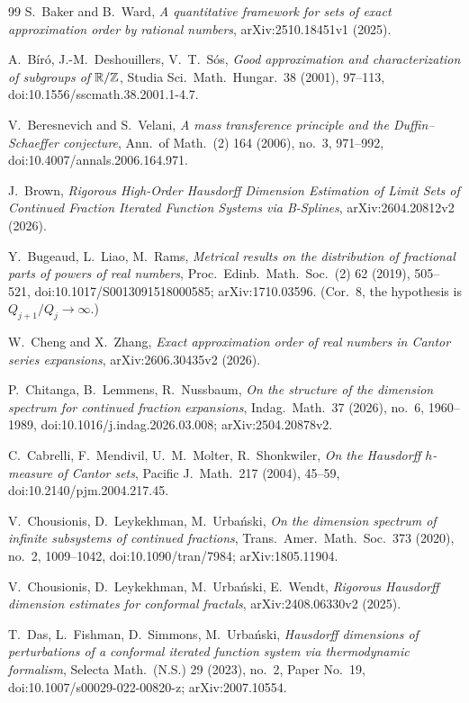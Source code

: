 \begin{thebibliography}{99}
 S.~Baker and B.~Ward, \emph{A quantitative framework for sets of
exact approximation order by rational numbers}, arXiv:2510.18451v1 (2025).

 A.~B\'ir\'o, J.-M.~Deshouillers, V.~T.~S\'os, \emph{Good
approximation and characterization of subgroups of $\mathbb{R}/\mathbb{Z}$}, Studia Sci.\ Math.\ Hungar.\ 38 (2001), 97--113, doi:10.1556/sscmath.38.2001.1-4.7.

 V.~Beresnevich and S.~Velani, \emph{A mass transference principle
and the Duffin--Schaeffer conjecture}, Ann.\ of Math.\ (2) 164 (2006), no.~3, 971--992, doi:10.4007/annals.2006.164.971.

 J.~Brown, \emph{Rigorous High-Order Hausdorff Dimension
Estimation of Limit Sets of Continued Fraction Iterated Function Systems via B-Splines},
arXiv:2604.20812v2 (2026).

 Y.~Bugeaud, L.~Liao, M.~Rams, \emph{Metrical results on the
distribution of fractional parts of powers of real numbers}, Proc.\ Edinb.\ Math.\ Soc.\ (2) 62 (2019), 505--521, doi:10.1017/S0013091518000585; arXiv:1710.03596. (Cor.~8, the hypothesis is $Q_{j+1}/Q_j\to\infty$.)

 W.~Cheng and X.~Zhang, \emph{Exact approximation order of real numbers in
Cantor series expansions}, arXiv:2606.30435v2 (2026).

 P.~Chitanga, B.~Lemmens, R.~Nussbaum, \emph{On the structure of
the dimension spectrum for continued fraction expansions}, Indag.\ Math.\ 37 (2026),
no.~6, 1960--1989, doi:10.1016/j.indag.2026.03.008; arXiv:2504.20878v2.

 C.~Cabrelli, F.~Mendivil, U.~M.~Molter, R.~Shonkwiler,
\emph{On the Hausdorff $h$-measure of Cantor sets}, Pacific J.\ Math.\ 217
(2004), 45--59, doi:10.2140/pjm.2004.217.45.

 V.~Chousionis, D.~Leykekhman, M.~Urba\'nski, \emph{On the
dimension spectrum of infinite subsystems of continued fractions}, Trans.\ Amer.\ Math.\ Soc.\ 373 (2020), no.~2, 1009--1042, doi:10.1090/tran/7984; arXiv:1805.11904.

 V.~Chousionis, D.~Leykekhman, M.~Urba\'nski, E.~Wendt,
\emph{Rigorous Hausdorff dimension estimates for conformal fractals},
arXiv:2408.06330v2 (2025).

{\sloppy
{} T.~Das, L.~Fishman, D.~Simmons, M.~Urba\'nski, \emph{Hausdorff
dimensions of perturbations of a conformal iterated function system via
thermodynamic formalism}, Selecta Math.\ (N.S.) 29 (2023), no.~2, Paper No.~19,
doi:10.1007/s00029-022-00820-z; arXiv:2007.10554.
}


\end{thebibliography}
